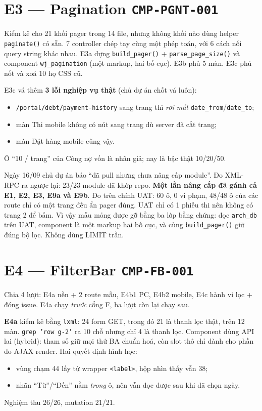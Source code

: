 \section{E3 --- Pagination \texttt{CMP-PGNT-001}}

Kiểm kê cho 21 khối pager trong 14 file, nhưng không khối nào dùng helper
\texttt{paginate()} có sẵn. 7 controller chép tay cùng một phép toán, với 6 cách nối query string khác
nhau. E3a dựng \texttt{build\_pager()} + \texttt{parse\_page\_size()} và component \texttt{wj\_pagination}
(một markup, hai bố cục). E3b phủ 5 màn. E3c phủ nốt và xoá 10 họ CSS cũ.

E3c vá thêm \textbf{3 lỗi nghiệp vụ thật} (chủ dự án chốt vá luôn):
\begin{itemize}[nosep]
\item \texttt{/portal/debt/payment-history} sang trang thì \emph{rơi mất} \texttt{date\_from}/\texttt{date\_to};
\item màn Thi mobile không có nút sang trang dù server đã cắt trang;
\item màn Đặt hàng mobile cũng vậy.
\end{itemize}
Ô ``10 / trang'' của Công nợ vốn là nhãn giả; nay là bậc thật 10/20/50.

Ngày 16/09 chủ dự án báo ``đã pull nhưng chưa nâng cấp module''. Đo XML-RPC ra ngược lại:
23/23 module đã khớp repo. \textbf{Một lần nâng cấp đã gánh cả E1, E2, E3, E9a và E9b}. Đo trên chính
UAT: 60 ô, 0 vi phạm, 48/48 ô của các route chỉ có một trang đều ẩn pager đúng. UAT chỉ có 1 phiếu thi
nên không có trang 2 để bấm. Vì vậy mẫu mỏng được gỡ bằng ba lớp bằng chứng: đọc \texttt{arch\_db}
trên UAT, component là một markup hai bố cục, và cùng \texttt{build\_pager()} giữ đúng bộ lọc. Không dùng
LIMIT trần.

\section{E4 --- FilterBar \texttt{CMP-FB-001}}

Chia 4 lượt: E4a nền + 2 route mẫu, E4b1 PC, E4b2 mobile, E4c hành vi lọc + đóng issue. E4a chạy
\emph{trước} cổng F, ba lượt còn lại chạy sau.

\textbf{E4a} kiểm kê bằng \texttt{lxml}: 24 form GET, trong đó 21 là thanh lọc thật, trên 12 màn.
\texttt{grep 'row g-2'} ra 10 chỗ nhưng chỉ 4 là thanh lọc. Component dùng API lai (hybrid): tham số giữ
mọi thứ BA chuẩn hoá, còn slot thô chỉ dành cho phần do AJAX render. Hai quyết định hình học:
\begin{itemize}[nosep]
\item vùng chạm 44 lấy từ wrapper \texttt{<label>}, hộp nhìn thấy vẫn 38;
\item nhãn ``Từ''/``Đến'' nằm \emph{trong} ô, nên vẫn đọc được sau khi đã chọn ngày.
\end{itemize}
Nghiệm thu 26/26, mutation 21/21.

